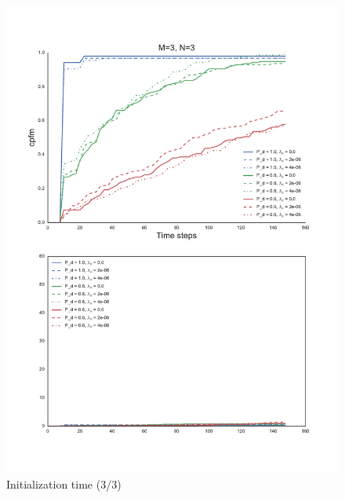 \begin{figure}
\centering
\includegraphics[height = .9\textheight]{Figures/plots/Scenario1_Init-Time(3-3).pdf}
\caption{Initialization time (3/3)}\label{fig:init_time_3-3}
\end{figure}

